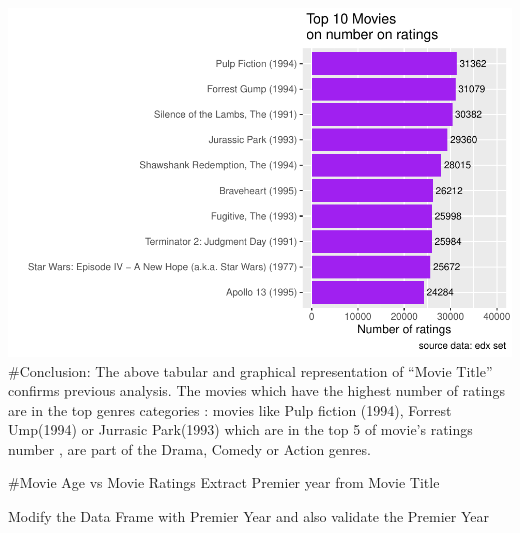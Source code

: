 \documentclass[
]{article}
\newenvironment{Shaded}{\begin{snugshade}}{\end{snugshade}}
\newcommand{\CommentTok}[1]{\textcolor[rgb]{0.56,0.35,0.01}{\textit{#1}}}
\newcommand{\DataTypeTok}[1]{\textcolor[rgb]{0.13,0.29,0.53}{#1}}
\newcommand{\DecValTok}[1]{\textcolor[rgb]{0.00,0.00,0.81}{#1}}
\newcommand{\KeywordTok}[1]{\textcolor[rgb]{0.13,0.29,0.53}{\textbf{#1}}}
\newcommand{\NormalTok}[1]{#1}
\newcommand{\OperatorTok}[1]{\textcolor[rgb]{0.81,0.36,0.00}{\textbf{#1}}}
\newcommand{\StringTok}[1]{\textcolor[rgb]{0.31,0.60,0.02}{#1}}
\begin{document}
\includegraphics{MovieLensProjectReport_files/figure-latex/MovieTitle Graphical Representation-1.pdf}
\#Conclusion: The above tabular and graphical representation of ``Movie
Title'' confirms previous analysis. The movies which have the highest
number of ratings are in the top genres categories : movies like Pulp
fiction (1994), Forrest Ump(1994) or Jurrasic Park(1993) which are in
the top 5 of movie's ratings number , are part of the Drama, Comedy or
Action genres.

\#Movie Age vs Movie Ratings Extract Premier year from Movie Title

\begin{Shaded}
\end{Shaded}

Modify the Data Frame with Premier Year and also validate the Premier
Year

\begin{Shaded}
\end{Shaded}
\end{document}
